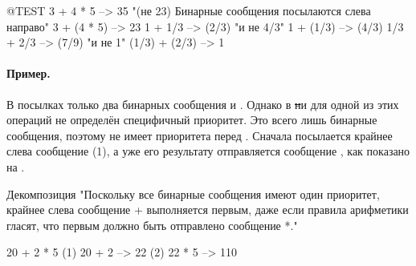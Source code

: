 \documentclass[a4paper,10pt,twoside]{book}
\begin{document}
\begin{code}{@TEST}
3 + 4 * 5      --> 35    "(не 23)  Бинарные сообщения посылаются слева направо"
3 + (4 * 5)    --> 23
1 + 1/3         --> (2/3)    "и не 4/3"
1 + (1/3)       --> (4/3)
1/3 + 2/3       --> (7/9)    "и не 1"
(1/3) + (2/3)  --> 1
\end{code}

\paragraph{Пример.} 
В посылках  только два бинарных сообщения \ct{+} и \ct{*}. Однако в \st ни для одной из этих операций не определён специфичный приоритет. Это всего лишь бинарные сообщения, поэтому \ct{*} не имеет приоритета перед \ct{+}. Сначала посылается крайнее слева сообщение \ct{+} (1), а уже его результату отправляется сообщение \ct{*}, как показано на .

\begin{example}[binaryMessages1]{Декомпозиция }{}
"Поскольку все бинарные сообщения имеют один приоритет, крайнее слева сообщение + выполняется первым, даже если правила арифметики гласят, что первым должно быть отправлено сообщение *."

      20 + 2 * 5 
(1)  20 + 2 --> 22
(2)  22       * 5 --> 110
\end{example}
\end{document}
